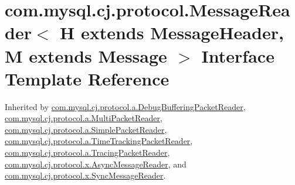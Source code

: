 \hypertarget{interfacecom_1_1mysql_1_1cj_1_1protocol_1_1_message_reader}{}\section{com.\+mysql.\+cj.\+protocol.\+Message\+Reader$<$ H extends Message\+Header, M extends Message $>$ Interface Template Reference}
\label{interfacecom_1_1mysql_1_1cj_1_1protocol_1_1_message_reader}


Inherited by \mbox{\hyperlink{classcom_1_1mysql_1_1cj_1_1protocol_1_1a_1_1_debug_buffering_packet_reader}{com.\+mysql.\+cj.\+protocol.\+a.\+Debug\+Buffering\+Packet\+Reader}}, \mbox{\hyperlink{classcom_1_1mysql_1_1cj_1_1protocol_1_1a_1_1_multi_packet_reader}{com.\+mysql.\+cj.\+protocol.\+a.\+Multi\+Packet\+Reader}}, \mbox{\hyperlink{classcom_1_1mysql_1_1cj_1_1protocol_1_1a_1_1_simple_packet_reader}{com.\+mysql.\+cj.\+protocol.\+a.\+Simple\+Packet\+Reader}}, \mbox{\hyperlink{classcom_1_1mysql_1_1cj_1_1protocol_1_1a_1_1_time_tracking_packet_reader}{com.\+mysql.\+cj.\+protocol.\+a.\+Time\+Tracking\+Packet\+Reader}}, \mbox{\hyperlink{classcom_1_1mysql_1_1cj_1_1protocol_1_1a_1_1_tracing_packet_reader}{com.\+mysql.\+cj.\+protocol.\+a.\+Tracing\+Packet\+Reader}}, \mbox{\hyperlink{classcom_1_1mysql_1_1cj_1_1protocol_1_1x_1_1_async_message_reader}{com.\+mysql.\+cj.\+protocol.\+x.\+Async\+Message\+Reader}}, and \mbox{\hyperlink{classcom_1_1mysql_1_1cj_1_1protocol_1_1x_1_1_sync_message_reader}{com.\+mysql.\+cj.\+protocol.\+x.\+Sync\+Message\+Reader}}.

